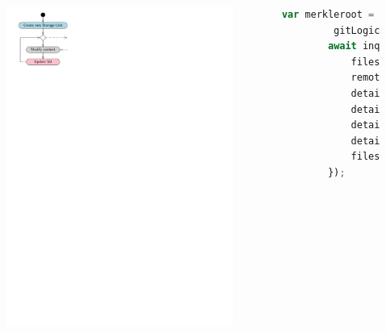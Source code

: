 \documentclass{beamer}
\begin{document}
\begin{frame}[fragile]
\begin{columns}
\begin{figure}
			\includegraphics[width=\textwidth]{figures/create.pdf}
			\bigskip
		\end{figure}
		\begin{lstlisting}[language=JavaScript, numbers=none]
		var merkleroot =
		 gitLogic.calculateTree(filelist);
		await inquirer.askSUDetails(
			files.getCurrentDirectoryBase(),
			remote).then((details) => {
			details.owner = w1
			details.hash = merkleroot
			details.filelist = filelist
			details.closed = false
			files.saveJSON(details);
		});
		\end{lstlisting}
	\end{columns}
\end{frame}
\end{document}
